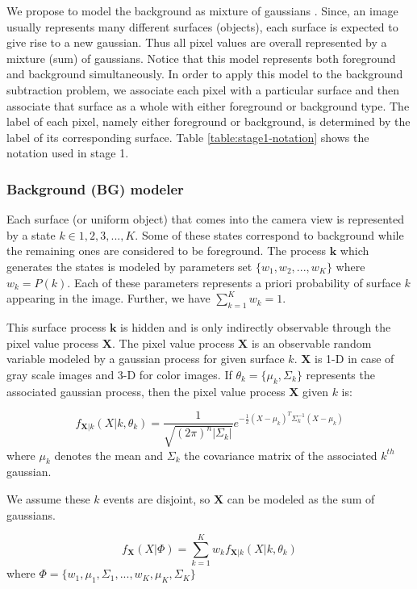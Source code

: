 We propose to model the background as mixture of gaussians \cite{stauffer1999adaptive,power2002understanding}. Since, an image usually represents many different surfaces (objects), each surface is expected to give rise to a new gaussian. Thus all pixel values are overall represented by a mixture (sum) of gaussians. Notice that this model represents both foreground and background simultaneously. In order to apply this model to the background subtraction problem, we associate each pixel with a particular surface and then associate that surface as a whole with either foreground or background type. The label of each pixel, namely either foreground or background, is determined by the label of its corresponding surface. Table \ref{table:stage1-notation} shows the notation used in stage 1.


\subsubsection{Background (BG) modeler}
Each surface (or uniform object) that comes into the camera view is represented by a state $k \in {1,2,3,...,K}$. Some of these states correspond to  background while the remaining ones are considered to be foreground. The process  $\mathbf{k}$ which generates the states is modeled by parameters set $\{w_1, w_2, ..., w_K\}$ where $w_k = P(k)$. Each of these parameters represents  a priori probability of surface $k$ appearing in the image. Further, we have $\sum_{k=1}^K w_k=1$. 

This surface process $\mathbf{k}$ is hidden and is only indirectly observable through the pixel value process $\mathbf{X}$. The pixel value process $\mathbf{X}$ is an observable random variable modeled by a gaussian process for given surface $k$. $\mathbf{X}$ is 1-D in case of gray scale images and 3-D for color images.  If $\theta_k= \{\mu_k, \Sigma_k \}$  represents the associated gaussian process, then the pixel value process $\mathbf{X}$ given $k$ is: 

$$ f_{\mathbf{X}|k}(X|k,\theta_k)=\frac{1}{\sqrt{(2\pi)^n |\Sigma_k |}}e^{-\frac{1}{2}(X-\mu_k)^T \Sigma_k^{-1} (X-\mu_k)} $$
where $\mu_k$ denotes the mean and $\Sigma_k$ the covariance matrix of the associated $k^{th}$ gaussian. 

We assume these $k$ events are disjoint, so $\mathbf{X}$ can be modeled as the sum of gaussians. 

$$ f_{\mathbf{X}}(X|\Phi)=\sum_{k=1}^K w_k f_{\mathbf{X}|k}(X|k,\theta_k)  $$
where $ \Phi = \{w_1, \mu_1, \Sigma_1,..., w_K, \mu_K, \Sigma_K \}$ 

